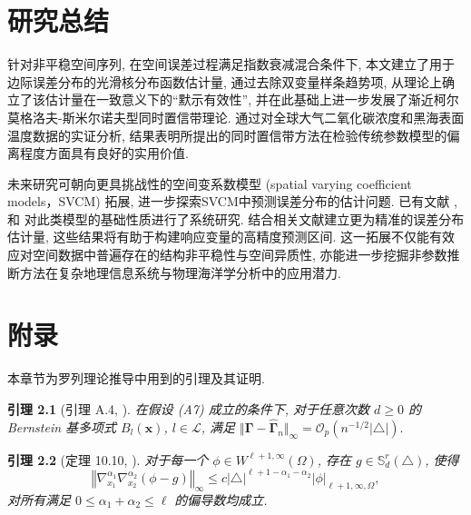 \documentclass[a4paper,openay,14pt]{ctexbook}
\newtheorem{lem}{引理}
\numberwithin{equation}{section}
\numberwithin{lem}{section}
\newcommand{\chapterwithfancyheader}[1]{  
    \chapter{#1} %
    \thispagestyle{fancy} %
}
\begin{document}
\chapterwithfancyheader{研究总结}\label{SEC: Conclusion}
针对非平稳空间序列, 在空间误差过程满足指数衰减混合条件下, 本文建立了用于边际误差分布的光滑核分布函数估计量, 通过去除双变量样条趋势项, 从理论上确立了该估计量在一致意义下的“默示有效性”, 并在此基础上进一步发展了渐近柯尔莫格洛夫-斯米尔诺夫型同时置信带理论. 通过对全球大气二氧化碳浓度和黑海表面温度数据的实证分析, 结果表明所提出的同时置信带方法在检验传统参数模型的偏离程度方面具有良好的实用价值.

未来研究可朝向更具挑战性的空间变系数模型 (spatial varying coefficient models，SVCM) 拓展, 进一步探索SVCM中预测误差分布的估计问题. 已有文献 \cite{wang2020efficient}, \cite{mu2018estimation}和\cite{mu2020spatial} 对此类模型的基础性质进行了系统研究. 结合相关文献建立更为精准的误差分布估计量, 这些结果将有助于构建响应变量的高精度预测区间. 这一拓展不仅能有效应对空间数据中普遍存在的结构非平稳性与空间异质性, 亦能进一步挖掘非参数推断方法在复杂地理信息系统与物理海洋学分析中的应用潜力.


\backmatter
\newpage
{}  

\normalem 



\newpage
\pagestyle{fancy}
\chapterwithfancyheader{附录}\label{SEC: proof}
\setcounter{section}{0}
\setcounter{equation}{0}
\def\theequation{A.\arabic{equation}}
\def\thesection{A}
\renewcommand{\thelemma}{A.\arabic{lemma}} 

本章节为罗列理论推导中用到的引理及其证明. 



\begin{lem}[引理 A.4, \cite{yu2019estimation}]\label{Lemma:Gamma-Gammahat}
在假设 (A7) 成立的条件下, 对于任意次数 \( d \geq 0 \) 的 Bernstein 基多项式 \( B_l(\boldsymbol{x}) \),  \( l \in \mathcal{L} \), 满足
\(\Vert \bm{\Gamma} - \hat{\bm{\Gamma}}_{n} \Vert_{\infty} = \mathcal{O}_p\left(n^{-1/2} |\triangle|\right).\)
\end{lem}

\begin{lem}[定理 10.10, \cite{lai2007spline}]\label{Lemma:phi-g}
    对于每一个 $\phi\in W^{\ell+1,\infty}(\Omega)$, 存在 $g\in\mathbb{S}_d^r(\triangle)$, 使得 
    $$\left\Vert \nabla_{x_1}^{\alpha_1}\nabla_{x_2}^{\alpha_2}(\phi-g)\right\Vert_{\infty}\leq c\vert \triangle\vert^{\ell+1-\alpha_1-\alpha_2}\vert \phi\vert_{\ell+1,\infty,\Omega},$$
    对所有满足 $0\leq \alpha_1+\alpha_2\leq \ell$ 的偏导数均成立.
\end{lem}
\end{document}
